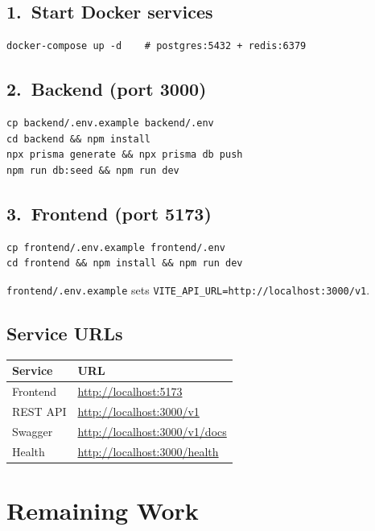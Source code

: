 \documentclass[11pt,a4paper]{article}
\begin{document}
\subsection{1.\ Start Docker services}

\begin{verbatim}
docker-compose up -d    # postgres:5432 + redis:6379
\end{verbatim}

\subsection{2.\ Backend (port 3000)}

\begin{verbatim}
cp backend/.env.example backend/.env
cd backend && npm install
npx prisma generate && npx prisma db push
npm run db:seed && npm run dev
\end{verbatim}

\subsection{3.\ Frontend (port 5173)}

\begin{verbatim}
cp frontend/.env.example frontend/.env
cd frontend && npm install && npm run dev
\end{verbatim}

\texttt{frontend/.env.example} sets \texttt{VITE\_API\_URL=http://localhost:3000/v1}.

\subsection{Service URLs}

\begin{tabular}{@{}ll@{}}
\toprule
\textbf{Service} & \textbf{URL} \\
\midrule
Frontend & \url{http://localhost:5173} \\
REST API & \url{http://localhost:3000/v1} \\
Swagger & \url{http://localhost:3000/v1/docs} \\
Health & \url{http://localhost:3000/health} \\
\bottomrule
\end{tabular}

\section{Remaining Work}
\end{document}

